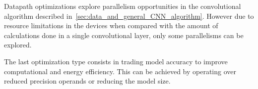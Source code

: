 Datapath optimizations explore parallelism opportunities in the convolutional algorithm described in~\ref{sec:data_and_general_CNN_algorithm}. However due to resource limitations in the devices when compared with the amount of calculations done in a single convolutional layer, only some parallelisms can be explored.

The last optimization type consists in trading model accuracy to improve computational and energy efficiency. This can be achieved by operating over reduced precision operands or reducing the model size.


%
%

